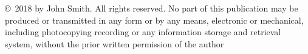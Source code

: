 \thispagestyle{empty}
\null\vfill
\noindent\copyright~2018 by John Smith. All rights reserved. No part of this publication may be produced or transmitted in any form or by any means, electronic or mechanical, including photocopying recording or any information storage and retrieval system, without the prior written permission of the author 


